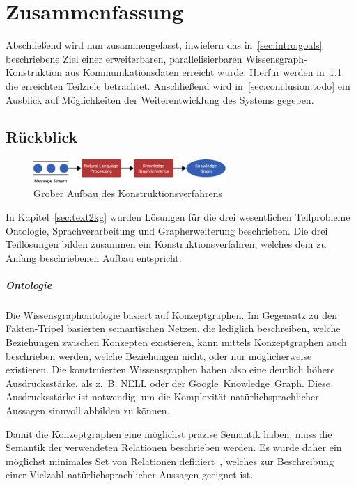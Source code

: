 \chapter{Zusammenfassung}%
\label{sec:conclusion}

Abschließend wird nun zusammengefasst, inwiefern das in~\ref{sec:intro:goals} beschriebene Ziel einer erweiterbaren, parallelisierbaren Wissensgraph-Konstruktion aus Kommunikationsdaten erreicht wurde.
Hierfür werden in~\ref{sec:conclusion:review} die erreichten Teilziele betrachtet.
Anschließend wird in~\ref{sec:conclusion:todo} ein Ausblick auf Möglichkeiten der Weiterentwicklung des Systems gegeben.

\section{Rückblick}%
\label{sec:conclusion:review}

\begin{figure}[h]
	\centering
	\includegraphics[width=0.65\textwidth]{gfx/conclusion/overview.pdf}
	\caption{Grober Aufbau des Konstruktionsverfahrens}\label{fig:conclusion:overview}
\end{figure}
In Kapitel~\ref{sec:text2kg} wurden Lösungen für die drei wesentlichen Teilprobleme Ontologie, Sprachverarbeitung und Grapherweiterung beschrieben.
Die drei Teillösungen bilden zusammen ein Konstruktionsverfahren, welches dem zu Anfang beschriebenen Aufbau entspricht.

\paragraph{Ontologie}
Die Wissensgraphontologie basiert auf Konzeptgraphen.
Im Gegensatz zu den Fakten-Tripel basierten semantischen Netzen, die lediglich beschreiben, welche Beziehungen zwischen Konzepten existieren, kann mittels Konzeptgraphen auch beschrieben werden, welche Beziehungen nicht, oder nur möglicherweise existieren.
Die konstruierten Wissensgraphen haben also eine deutlich höhere Ausdrucksstärke, als z.~B. NELL oder der Google~Knowledge~Graph.
Diese Ausdrucksstärke ist notwendig, um die Komplexität natürlichsprachlicher Aussagen sinnvoll abbilden zu können.

Damit die Konzeptgraphen eine möglichst präzise Semantik haben, muss die Semantik der verwendeten Relationen beschrieben werden.
Es wurde daher ein möglichst minimales Set von Relationen definiert~, welches zur Beschreibung einer Vielzahl natürlichsprachlicher Aussagen geeignet ist.

